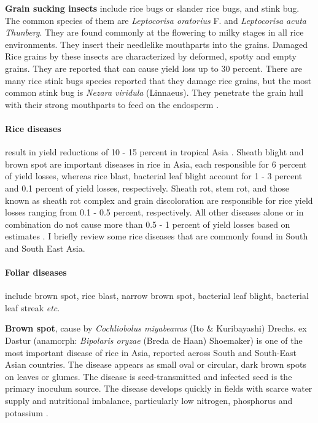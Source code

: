 \documentclass[12pt, oneside]{report}
\begin{document}
\textbf{Grain sucking insects} include rice bugs or slander rice bugs, and stink bug. The common species of them are \textit{Leptocorisa oratorius} F. and \textit{Leptocorisa acuta Thunberg}. They are found commonly at the flowering to milky stages in all rice environments. They insert their needlelike mouthparts into the grains. Damaged Rice grains by these insects are characterized by deformed, spotty and empty grains. They are reported that can cause yield loss up to 30 percent. There are many rice stink bugs species reported that they damage rice grains, but the most common stink bug is \textit{Nezara viridula} (Linnaeus). They penetrate the grain hull with their strong mouthparts to feed on the endosperm \citep{shepard1995rice}.

\paragraph{Rice diseases} result in yield reductions of 10 - 15 percent in tropical Asia \citep{ willocquet2004research}. Sheath blight and brown spot are important diseases in rice in Asia, each responsible for 6 percent of yield losses, whereas rice blast, bacterial leaf blight account for 1 - 3 percent and 0.1 percent of yield losses, respectively. Sheath rot, stem rot, and those known as sheath rot complex and grain discoloration are responsible for rice yield losses ranging from 0.1 - 0.5 percent, respectively. All other diseases alone or in combination do not cause more than 0.5 - 1 percent of yield losses based on estimates \citep{Savary:2000vr, mew2002handbook}. I briefly review some rice diseases that are commonly found in South and South East Asia. 

\paragraph{Foliar diseases} include brown spot, rice blast, narrow brown spot, bacterial leaf blight, bacterial leaf streak \textit{etc}.

\textbf{Brown spot}, cause by \textit{Cochliobolus miyabeanus} (Ito \& Kuribayashi) Drechs. ex Dastur (anamorph: \textit{Bipolaris oryzae} (Breda de Haan) Shoemaker) is one of the most important disease of rice in Asia, reported across South and South-East Asian countries. The disease appears as small oval or circular, dark brown spots on leaves or glumes. The disease is seed-transmitted and infected seed is the primary inoculum source. The disease develops quickly in fields with scarce water supply and nutritional imbalance, particularly low nitrogen, phosphorus and potassium \citep{barnwal2013review}.
\end{document}
